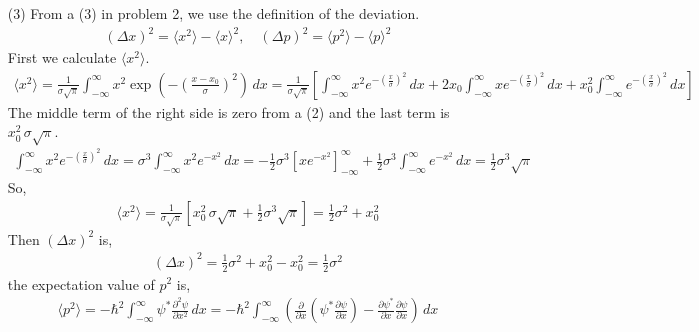 \documentclass[aps,floatfix,nofootinbib,superscriptaddress,fleqn]{revtex4}
\begin{document}
\begin{itemize}
  \item[(3)] From a (3) in problem 2, we use the definition of the deviation.
    \begin{align}
      {(\Delta x)}^2 = \langle x^2\rangle - \langle x\rangle^2 ,\quad {(\Delta p)}^2 = \langle p^2\rangle - \langle p\rangle^2 
    \end{align}
  First we calculate $\langle x^2\rangle$.
    \begin{align}
      \langle x^2\rangle = \frac{1}{\sigma\sqrt{\pi}}\int_{-\infty}^{\infty} x^2 \exp\left(-{\left( \frac{x-x_0}{\sigma} \right)}^2\right)\,dx
                        = \frac{1}{\sigma\sqrt{\pi}}\left[\int_{-\infty}^{\infty} x^2 e^{-{\left( \frac{x}{\sigma} \right)}^2}\,dx
                                                        +2x_0\int_{-\infty}^{\infty} xe^{-{\left( \frac{x}{\sigma} \right)}^2}\,dx
                                                        +x^2_0\int_{-\infty}^{\infty} e^{-{\left( \frac{x}{\sigma} \right)}^2}\,dx\right]
    \end{align}
  The middle term of the right side is zero from a (2) and the last term is $x^2_0\,\sigma\sqrt{\pi}$.
    \begin{align}
      \int_{-\infty}^{\infty} x^2 e^{-{\left( \frac{x}{\sigma} \right)}^2}\,dx = \sigma^3\int_{-\infty}^{\infty} x^2 e^{-x^2}\,dx 
                                                            = -\frac{1}{2}\sigma^3{\left[xe^{-x^2}\right]}^{\infty}_{-\infty}
                                                              +\frac{1}{2}\sigma^3\int_{-\infty}^{\infty} e^{-x^2}\,dx
                                                            = \frac{1}{2}\sigma^3\sqrt{\pi}
    \end{align}
  So,
    \begin{align}
      \langle x^2 \rangle = \frac{1}{\sigma\sqrt{\pi}}\left[ x^2_0\,\sigma\sqrt{\pi}
                            + \frac{1}{2}\sigma^3\sqrt{\pi} \right]
                          = \frac{1}{2}\sigma^2+x_0^2
    \end{align}
  Then $\left(\Delta x\right)^2$ is,
    \begin{align}
      \left(\Delta x\right)^2 = \frac{1}{2}\sigma^2+x_0^2 - x_0^2 = \frac{1}{2}\sigma^2
    \end{align}
  the expectation value of $p^2$ is,
    \begin{align}
      \langle p^2 \rangle = -\hbar^2 \int_{-\infty}^{\infty} \psi^* \frac{\partial^2 \psi}{\partial x^2}\,dx 
      = -\hbar^2\int_{-\infty}^{\infty} \left(\frac{\partial}{\partial x} \left(\psi^* \frac{\partial \psi}{\partial x}\right) - \frac{\partial \psi^*}{\partial x}\frac{\partial \psi}{\partial x}\right)\,dx

\end{align}
\end{itemize}
\end{document}
